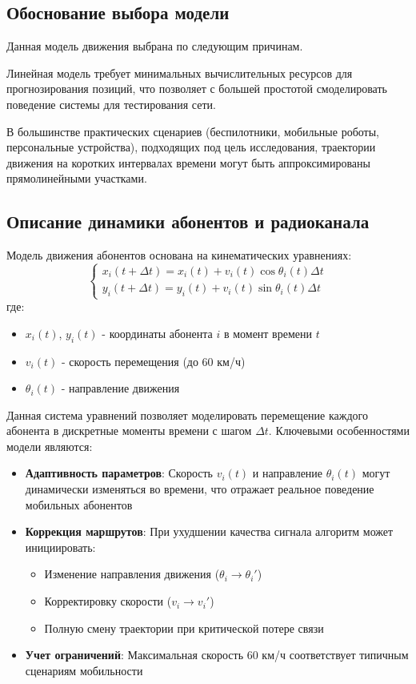 \subsection{Обоснование выбора модели}

Данная модель движения выбрана по следующим причинам.

Линейная модель требует минимальных вычислительных ресурсов для прогнозирования позиций, что позволяет с большей простотой смоделировать поведение 
системы для тестирования сети.

В большинстве практических сценариев (беспилотники, мобильные роботы, персональные устройства), подходящих под цель исследования, траектории
движения на коротких интервалах времени могут быть аппроксимирова­ны прямолинейными участками.

\subsection{Описание динамики абонентов и радиоканала} \label{ch2:sec1:sub1}

Модель движения абонентов основана на кинематических уравнениях:
\begin{equation}
\begin{cases}
x_i(t+\Delta t) = x_i(t) + v_i(t)\cos\theta_i(t)\Delta t \\
y_i(t+\Delta t) = y_i(t) + v_i(t)\sin\theta_i(t)\Delta t
\end{cases}
\end{equation}
где:
\begin{itemize}
\item $x_i(t)$, $y_i(t)$ - координаты абонента $i$ в момент времени $t$
\item $v_i(t)$ - скорость перемещения (до 60 км/ч)
\item $\theta_i(t)$ - направление движения
\end{itemize}

Данная система уравнений позволяет моделировать перемещение каждого абонента в дискретные моменты времени с шагом $\Delta t$. Ключевыми особенностями модели 
являются:

\begin{itemize}
\item \textbf{Адаптивность параметров}: Скорость $v_i(t)$ и направление $\theta_i(t)$ могут динамически изменяться во времени, что отражает реальное 
поведение мобильных абонентов

\item \textbf{Коррекция маршрутов}: При ухудшении качества сигнала алгоритм может инициировать:
\begin{itemize}
\item Изменение направления движения ($\theta_i \rightarrow \theta_i'$)
\item Корректировку скорости ($v_i \rightarrow v_i'$)
\item Полную смену траектории при критической потере связи
\end{itemize}

\item \textbf{Учет ограничений}: Максимальная скорость 60 км/ч соответствует типичным сценариям мобильности
\end{itemize}

